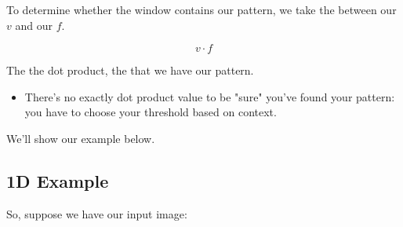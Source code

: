         \begin{concept}
            To determine whether the window contains our pattern, we take the  between our  $v$ and our  $f$.

            \begin{equation*}
                v \cdot f
            \end{equation*}

            The  the dot product, the  that we have our pattern.

            \subsecdiv

            \begin{itemize}
                \item There's no exactly dot product value to be "sure" you've found your pattern: you have to choose your threshold based on context.
            \end{itemize}
        \end{concept}

        We'll show our example below.

    \pagebreak
    \subsection{1D Example}

        So, suppose we have our input image:

